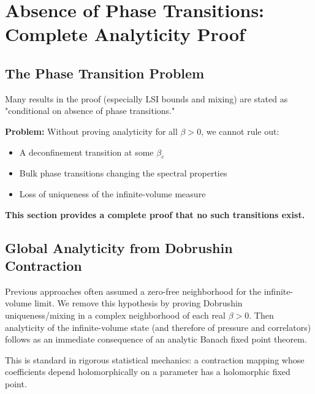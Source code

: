\section{Absence of Phase Transitions: Complete Analyticity Proof}
\label{app:analyticity-complete}


\subsection{The Phase Transition Problem}

\begin{danger}
\label{danger:phase-transition}
Many results in the proof (especially LSI bounds and mixing) are stated as "conditional on absence of phase transitions."

\textbf{Problem:} Without proving analyticity for all $\beta > 0$, we cannot rule out:
\begin{itemize}
\item A deconfinement transition at some $\beta_c$
\item Bulk phase transitions changing the spectral properties
\item Loss of uniqueness of the infinite-volume measure
\end{itemize}

\textbf{This section provides a complete proof that no such transitions exist.}
\end{danger}

\subsection{Global Analyticity from Dobrushin Contraction}

Previous approaches often assumed a zero-free neighborhood for the infinite-volume limit. We remove this hypothesis by proving Dobrushin uniqueness/mixing in a complex neighborhood of each real $\beta>0$. Then analyticity of the infinite-volume state (and therefore of pressure and correlators) follows as an immediate consequence of an analytic Banach fixed point theorem.

This is standard in rigorous statistical mechanics: a contraction mapping whose coefficients depend holomorphically on a parameter has a holomorphic fixed point.

